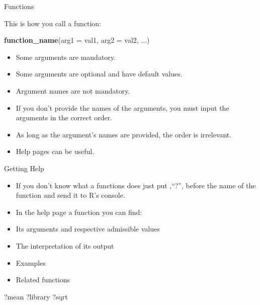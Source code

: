 \documentclass[ignorenonframetext,]{beamer}
\newenvironment{Shaded}{\begin{snugshade}}{\end{snugshade}}
\newcommand{\DataTypeTok}[1]{\textcolor[rgb]{0.13,0.29,0.53}{#1}}
\newcommand{\KeywordTok}[1]{\textcolor[rgb]{0.13,0.29,0.53}{\textbf{#1}}}
\newcommand{\NormalTok}[1]{#1}
\providecommand{\tightlist}{%
  \setlength{\itemsep}{0pt}\setlength{\parskip}{0pt}}
\begin{document}
\begin{frame}[fragile]{Functions}
\protect\hypertarget{functions-1}{}

This is how you call a function:

\begin{Shaded}
\begin{Highlighting}[]
\KeywordTok{function_name}\NormalTok{(}\DataTypeTok{arg1 =}\NormalTok{ val1, }\DataTypeTok{arg2 =}\NormalTok{ val2, ...)}
\end{Highlighting}
\end{Shaded}

\begin{itemize}
\tightlist
\item
  Some arguments are mandatory.
\item
  Some arguments are optional and have default values.
\item
  Argument names are not mandatory.
\item
  If you don't provide the names of the arguments, you must input the
  arguments in the correct order.
\item
  As long as the argument's names are provided, the order is irrelevant.
\item
  Help pages can be useful.
\end{itemize}

\end{frame}

\begin{frame}[fragile]{Getting Help}
\protect\hypertarget{getting-help}{}

\begin{itemize}
\item
  If you don't know what a functions does just put ,``?'', before the
  name of the function and send it to R's console.
\item
  In the help page a function you can find:
\item
  Its arguments and respective admissible values
\item
  The interpretation of its output
\item
  Examples
\item
  Related functions
\end{itemize}

\begin{Shaded}
\begin{Highlighting}[]
\NormalTok{?mean}
\NormalTok{?library}
\NormalTok{?sqrt}
\end{Highlighting}
\end{Shaded}

\end{frame}
\end{document}
